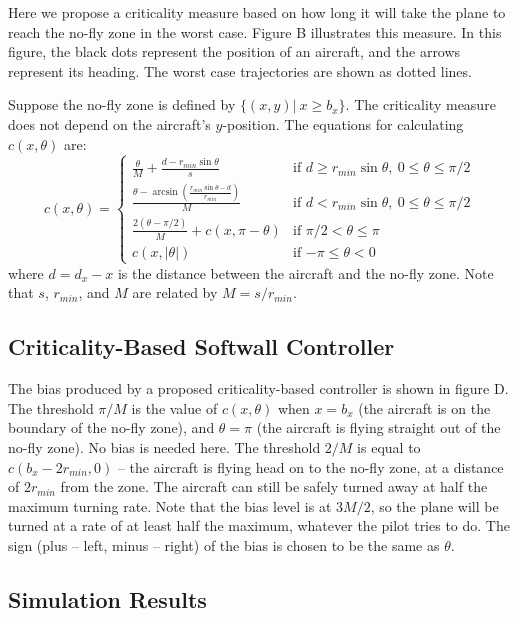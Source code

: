 \documentclass[11pt]{article}
\begin{document}
Here we propose a criticality measure based on how long it will take the plane
to reach the no-fly zone in the worst case. Figure B illustrates this measure.
In this figure, the black dots represent the position of an aircraft, and the
arrows represent its heading. The worst case trajectories are shown as dotted
lines.

Suppose the no-fly zone is defined by $\{(x,y)|\ x \geq b_{x}\}$. The 
criticality measure does not depend on the aircraft's $y$-position. The
equations for calculating $c(x, \theta)$ are:
\[
c(x, \theta) = \left\{ \begin{array}{ll}
\frac{\theta}{M} + \frac{d - r_{min}\sin{\theta}}{s} & \mbox{if $d \geq r_{min}\sin{\theta},\ 0 \leq \theta \leq \pi/2$} \\
\frac{\theta - \arcsin{\left( \frac{r_{min}\sin{\theta}- d}{r_{min}}\right) }}{M} & \mbox{if $d < r_{min}\sin{\theta},\ 0 \leq \theta \leq \pi/2$} \\
\frac{2(\theta - \pi/2)}{M} + c(x, \pi - \theta) & \mbox{if $\pi/2 < \theta \leq \pi$} \\
c(x, |\theta|) & \mbox{if $-\pi \leq \theta < 0$}
\end{array}
\right.
\]
where $d = d_{x} - x$ is the distance between the aircraft and the no-fly zone.
Note that $s$, $r_{min}$, and $M$ are related by $M = s/r_{min}$.

\subsection{Criticality-Based Softwall Controller}

The bias produced by a proposed criticality-based controller is shown in figure
D. The threshold $\pi/M$ is the value of $c(x, \theta)$ when $x = b_{x}$ (the 
aircraft is on the boundary of the no-fly zone), and $\theta = \pi$ (the 
aircraft is flying straight out of the no-fly zone). No bias is needed here.
The threshold $2/M$ is equal to $c(b_{x}-2r_{min}, 0)$ -- the aircraft is flying
head on to the no-fly zone, at a distance of $2r_{min}$ from the zone.
The aircraft can still be safely turned away at half the 
maximum turning rate. Note that the bias level is at $3M/2$, so the plane will
be turned at a rate of at least half the maximum, whatever the pilot tries to
do. The sign (plus -- left, minus -- right) of the bias is chosen to be the
same as $\theta$.

\subsection{Simulation Results}
\end{document}
